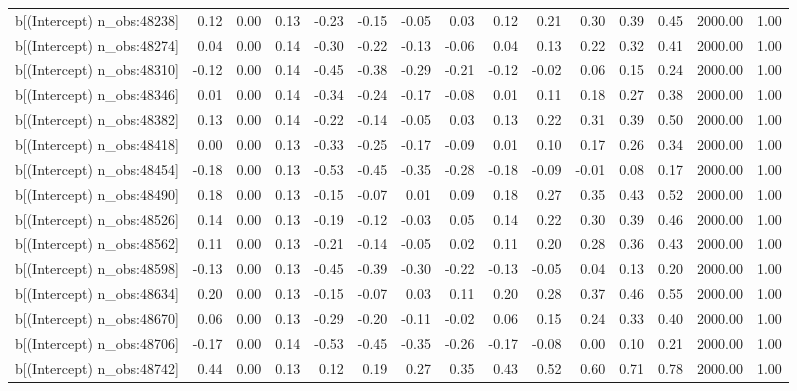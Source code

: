 \begin{table}[ht]
\begin{tabular}{rrrrrrrrrrrrrrr}
  b[(Intercept) n\_obs:48238] & 0.12 & 0.00 & 0.13 & -0.23 & -0.15 & -0.05 & 0.03 & 0.12 & 0.21 & 0.30 & 0.39 & 0.45 & 2000.00 & 1.00 \\ 
  b[(Intercept) n\_obs:48274] & 0.04 & 0.00 & 0.14 & -0.30 & -0.22 & -0.13 & -0.06 & 0.04 & 0.13 & 0.22 & 0.32 & 0.41 & 2000.00 & 1.00 \\ 
  b[(Intercept) n\_obs:48310] & -0.12 & 0.00 & 0.14 & -0.45 & -0.38 & -0.29 & -0.21 & -0.12 & -0.02 & 0.06 & 0.15 & 0.24 & 2000.00 & 1.00 \\ 
  b[(Intercept) n\_obs:48346] & 0.01 & 0.00 & 0.14 & -0.34 & -0.24 & -0.17 & -0.08 & 0.01 & 0.11 & 0.18 & 0.27 & 0.38 & 2000.00 & 1.00 \\ 
  b[(Intercept) n\_obs:48382] & 0.13 & 0.00 & 0.14 & -0.22 & -0.14 & -0.05 & 0.03 & 0.13 & 0.22 & 0.31 & 0.39 & 0.50 & 2000.00 & 1.00 \\ 
  b[(Intercept) n\_obs:48418] & 0.00 & 0.00 & 0.13 & -0.33 & -0.25 & -0.17 & -0.09 & 0.01 & 0.10 & 0.17 & 0.26 & 0.34 & 2000.00 & 1.00 \\ 
  b[(Intercept) n\_obs:48454] & -0.18 & 0.00 & 0.13 & -0.53 & -0.45 & -0.35 & -0.28 & -0.18 & -0.09 & -0.01 & 0.08 & 0.17 & 2000.00 & 1.00 \\ 
  b[(Intercept) n\_obs:48490] & 0.18 & 0.00 & 0.13 & -0.15 & -0.07 & 0.01 & 0.09 & 0.18 & 0.27 & 0.35 & 0.43 & 0.52 & 2000.00 & 1.00 \\ 
  b[(Intercept) n\_obs:48526] & 0.14 & 0.00 & 0.13 & -0.19 & -0.12 & -0.03 & 0.05 & 0.14 & 0.22 & 0.30 & 0.39 & 0.46 & 2000.00 & 1.00 \\ 
  b[(Intercept) n\_obs:48562] & 0.11 & 0.00 & 0.13 & -0.21 & -0.14 & -0.05 & 0.02 & 0.11 & 0.20 & 0.28 & 0.36 & 0.43 & 2000.00 & 1.00 \\ 
  b[(Intercept) n\_obs:48598] & -0.13 & 0.00 & 0.13 & -0.45 & -0.39 & -0.30 & -0.22 & -0.13 & -0.05 & 0.04 & 0.13 & 0.20 & 2000.00 & 1.00 \\ 
  b[(Intercept) n\_obs:48634] & 0.20 & 0.00 & 0.13 & -0.15 & -0.07 & 0.03 & 0.11 & 0.20 & 0.28 & 0.37 & 0.46 & 0.55 & 2000.00 & 1.00 \\ 
  b[(Intercept) n\_obs:48670] & 0.06 & 0.00 & 0.13 & -0.29 & -0.20 & -0.11 & -0.02 & 0.06 & 0.15 & 0.24 & 0.33 & 0.40 & 2000.00 & 1.00 \\ 
  b[(Intercept) n\_obs:48706] & -0.17 & 0.00 & 0.14 & -0.53 & -0.45 & -0.35 & -0.26 & -0.17 & -0.08 & 0.00 & 0.10 & 0.21 & 2000.00 & 1.00 \\ 
  b[(Intercept) n\_obs:48742] & 0.44 & 0.00 & 0.13 & 0.12 & 0.19 & 0.27 & 0.35 & 0.43 & 0.52 & 0.60 & 0.71 & 0.78 & 2000.00 & 1.00 \\ 

\end{tabular}
\end{table}
